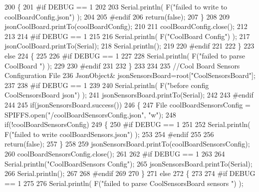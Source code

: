 \begin{DoxyCode}
200         \{   
201 \textcolor{preprocessor}{        #if DEBUG == 1}
202             
203             Serial.println( F(\textcolor{stringliteral}{"failed to write to coolBoardConfig.json"}) );
204 
205 \textcolor{preprocessor}{        #endif}
206             \textcolor{keywordflow}{return}(\textcolor{keyword}{false});
207         \}
208         
209         jsonCoolBoard.printTo(coolBoardConfig);
210         
211         coolBoardConfig.close();
212 
213 
214 \textcolor{preprocessor}{    #if DEBUG == 1}
215 
216         Serial.println( F(\textcolor{stringliteral}{"CoolBoard Config"}) );
217         jsonCoolBoard.printTo(Serial);
218         Serial.println();
219     
220 \textcolor{preprocessor}{    #endif}
221         
222     \}
223     \textcolor{keywordflow}{else}
224     \{
225     
226 \textcolor{preprocessor}{    #if DEBUG == 1 }
227 
228         Serial.println( F(\textcolor{stringliteral}{"failed to parse CoolBoard "}) );
229     
230 \textcolor{preprocessor}{    #endif}
231 
232     \}       
233 
234     
235     \textcolor{comment}{//Cool Board Sensors Configuration File}
236         JsonObject& jsonSensorsBoard=root[\textcolor{stringliteral}{"CoolSensorsBoard"}];
237 
238 \textcolor{preprocessor}{#if DEBUG == 1 }
239 
240     Serial.println( F(\textcolor{stringliteral}{"before config CoolSensorsBoard json"}) );
241     jsonSensorsBoard.printTo(Serial);
242 
243 \textcolor{preprocessor}{#endif }
244     
245     \textcolor{keywordflow}{if}(jsonSensorsBoard.success())
246     \{   
247         File coolBoardSensorsConfig = SPIFFS.open(\textcolor{stringliteral}{"/coolBoardSensorsConfig.json"}, \textcolor{stringliteral}{"w"}); 
248         \textcolor{keywordflow}{if}(!coolBoardSensorsConfig)
249         \{
250 \textcolor{preprocessor}{        #if DEBUG == 1 }
251         
252             Serial.println( F(\textcolor{stringliteral}{"failed to write coolBoardSensors.json"}) );
253 
254 \textcolor{preprocessor}{        #endif}
255 
256             \textcolor{keywordflow}{return}(\textcolor{keyword}{false});
257         \}
258         
259         jsonSensorsBoard.printTo(coolBoardSensorsConfig);
260         coolBoardSensorsConfig.close();
261 
262 \textcolor{preprocessor}{    #if DEBUG == 1}
263 
264         Serial.println(\textcolor{stringliteral}{"CoolBoardSensors Config"});
265         jsonSensorsBoard.printTo(Serial);
266         Serial.println();
267 
268 \textcolor{preprocessor}{    #endif}
269 
270     \}
271     \textcolor{keywordflow}{else}
272     \{
273 
274 \textcolor{preprocessor}{    #if DEBUG == 1}
275 
276         Serial.println( F(\textcolor{stringliteral}{"failed to parse CoolSensorsBoard sensors "}) );   

\end{DoxyCode}
